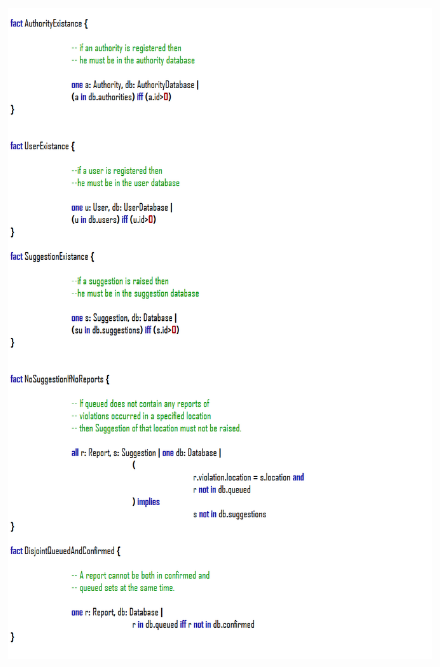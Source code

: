 \documentclass[12pt,a4paper]{article}
\begin{document}
				\begin{figure}[H]
				\centering
				\includegraphics[width=1\linewidth]{images/exports/user/Facts2.png}
				\label{fig:facts2}
			\end{figure}
\end{document}

